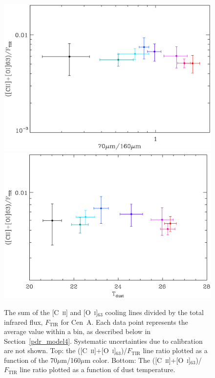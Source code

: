 \begin{figure}
\centering
\includegraphics[width=0.9\columnwidth]{ch4/CenA_CIIOI63onFtir_vs_70on160_uncorrected_plot_v1}
\includegraphics[width=0.9\columnwidth]{ch4/CenA_CIIOI63onFtir_vs_Tdust_uncorrected_plot_v1}
\caption[Heating efficiency as a function of dust temperature for Centaurus~A]{The sum of the [C~\textsc{ii}] and [O~\textsc{i}]$_{63}$ cooling lines divided by the total infrared flux, $F_{\mathrm{TIR}}$ for Cen~A.  Each data point represents the average value within a bin, as described below in Section~\ref{pdr_model4}.  Systematic uncertainties due to calibration are not shown. Top: the ([C~\textsc{ii}]+[O~\textsc{i}]$_{63}$)/$F_{\mathrm{TIR}}$ line ratio plotted as a function of the 70$\mu$m/160$\mu$m color.  Bottom: The ([C~\textsc{ii}]+[O~\textsc{i}]$_{63}$)/$F_{\mathrm{TIR}}$ line ratio plotted as a function of dust temperature.}
\label{fig:heat_eff}
\end{figure}

